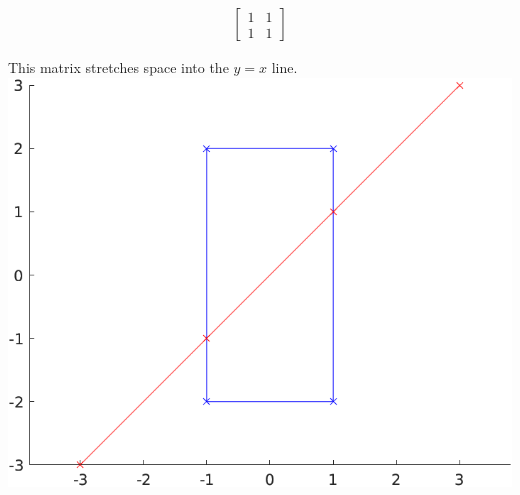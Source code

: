 \begin{align*}
    \begin{bmatrix}
        1 & 1 \\
        1 & 1
    \end{bmatrix}
\end{align*}

\begin{solution}
This matrix stretches space into the $y=x$ line.\\
\includegraphics{img/e2p2a.png}
\end{solution}